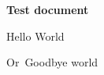 \documentclass[10pt,a4paper]{article}
\begin{document}
	\textbf{Test document}
	
	\fontsize{24}{10}\selectfont
		
	\begin{flushleft}
Hello World\end{flushleft}
\begin{flushleft}
Or\
Goodbye world\
	\end{flushleft}	
	
\end{document}

